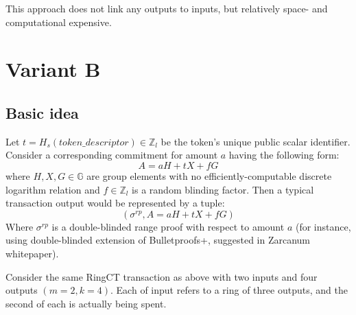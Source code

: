 \documentclass{article}
\begin{document}
This approach does not link any outputs to inputs, but relatively space- and computational expensive. 

\section{Variant B}

\subsection{Basic idea}
Let $t = H_s(\textit{token\_descriptor}) \in \mathbb{Z}_l$ be the token's unique public scalar identifier. Consider a corresponding commitment for amount $a$ having the following form:
\[
    A = aH + tX + fG
\]
where $H, X, G \in \mathbb{G}$ are group elements with no efficiently-computable discrete logarithm relation and $f \in \mathbb{Z}_l$ is a random blinding factor.
Then a typical transaction output would be represented by a tuple:
\[
    ( \sigma^{rp}, A = aH + tX + fG )
\]
Where $\sigma^{rp}$ is a double-blinded range proof with respect to amount $a$ (for instance, using double-blinded extension of Bulletproofs+, suggested in Zarcanum whitepaper).

Consider the same RingCT transaction as above with two inputs and four outputs $(m = 2, k = 4)$. Each of input refers to a ring of three outputs, and the second of each is actually being spent.
\vspace{10pt}
\end{document}
